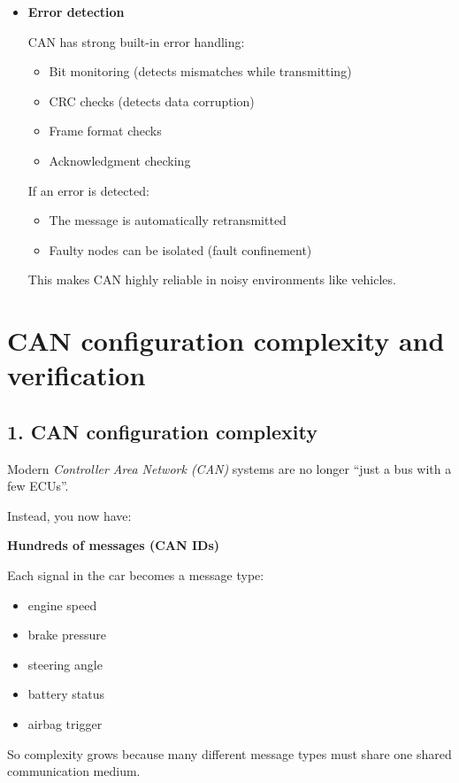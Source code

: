 \begin{itemize}
\item \textbf{Error detection}

CAN has strong built-in error handling:

\begin{itemize}
    \item Bit monitoring (detects mismatches while transmitting)
    \item CRC checks (detects data corruption)
    \item Frame format checks
    \item Acknowledgment checking
\end{itemize}

If an error is detected:
\begin{itemize}
    \item The message is automatically retransmitted
    \item Faulty nodes can be isolated (fault confinement)
\end{itemize}

This makes CAN highly reliable in noisy environments like vehicles.

\end{itemize}



\section{CAN configuration complexity and verification}

\subsection*{1. CAN configuration complexity}

Modern \textit{Controller Area Network (CAN)} systems are no longer ``just a bus with a few ECUs''.

Instead, you now have:

\textbf{Hundreds of messages (CAN IDs)}

Each signal in the car becomes a message type:
\begin{itemize}
\item engine speed
\item brake pressure
\item steering angle
\item battery status
\item airbag trigger
\end{itemize}

So complexity grows because many different message types must share one shared communication medium.

